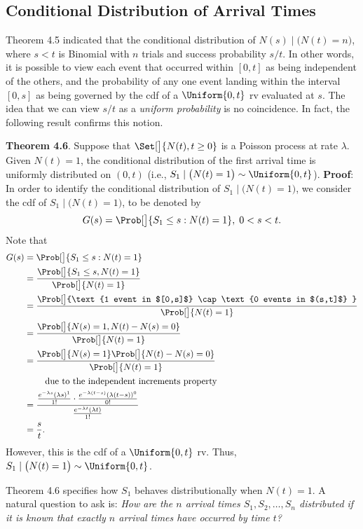 \subsection*{Conditional Distribution of Arrival Times}
Theorem 4.5 indicated that the conditional distribution of $ N(s)\mid \bigl(N(t)=n\bigr) $,
where $ s<t $ is Binomial with $ n $ trials and success probability $ s/t $. In other words,
it is possible to view each event that occurred within $ [0,t] $ as being independent of the others, and the probability of any
one event landing within the interval $ [0,s] $ as being governed by the cdf of a
$ \Uniform{0,t} $ rv evaluated at $ s $. The idea that we can view $s/t$ as a \emph{uniform probability} is no coincidence. In
fact, the following result confirms this notion.
\begin{Result}
    \textbf{Theorem 4.6}. Suppose that $ \Set[\big]{N(t),t\ge 0} $ is a Poisson process at rate $ \lambda $. Given $ N(t)=1 $,
    the conditional distribution of the first arrival time is uniformly distributed on $ (0,t) $ (i.e., $ S_1\mid \bigl(N(t)=1\bigr) \sim \Uniform{0,t} $).
    \tcblower{}
    \textbf{Proof}: In order to identify the conditional distribution of $ S_1\mid \bigl(N(t)=1\bigr) $,
    we consider the cdf of $ S_1\mid \bigl(N(t)=1\bigr) $, to be denoted by
    \[ G(s)=\Prob[\big]{S_1\le s\given N(t)=1},\;0<s<t. \]
    Note that
    \begin{align*}
        G(s)
         & =\Prob[\big]{S_1\le s\given N(t)=1}                                                                                                     \\
         & =\frac{\Prob[\big]{S_1\le s, N(t)=1}}{\Prob[\big]{N(t)=1}}                                                                              \\
         & =\frac{\Prob[\big]{\text{1 event in $[0,s]$} \cap \text{0 events in $(s,t]$} }}{\Prob[\big]{N(t)=1}}                                    \\
         & =\frac{\Prob[\big]{N(s)=1,N(t)-N(s)=0}}{\Prob[\big]{N(t)=1}}                                                                            \\
         & =\frac{\Prob[\big]{N(s)=1}\Prob[\big]{N(t)-N(s)=0}}{\Prob[\big]{N(t)=1}}                                                                \\
         & \phantom{{}={}}\quad\text{due to the independent increments property}                                                                   \\
         & =\frac{\frac{e^{-\lambda s}(\lambda s)^1}{1!}\cdot \frac{e^{-\lambda (t-s)}(\lambda(t-s))^0}{0!}}{\frac{e^{-\lambda t}(\lambda t)}{1!}} \\
         & =\frac{s}{t}.
    \end{align*}
    However, this is the cdf of a $ \Uniform{0,t} $ rv. Thus, $ S_1\mid \bigl(N(t)=1\bigr) \sim \Uniform{0,t} $.
\end{Result}
Theorem 4.6 specifies how $ S_1 $ behaves distributionally when $ N(t)=1 $. A natural question to ask is:
\emph{How are the $ n $ arrival times $ S_1,S_2,\ldots,S_n $ distributed if it is known that exactly $ n $ arrival times
    have occurred by time $ t $?}

